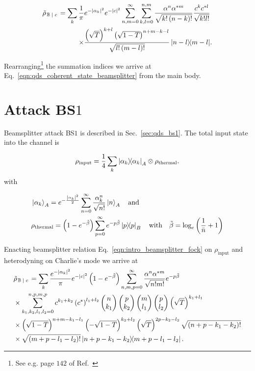 \begin{align}
\tilde{\rho}_{\left. \mathbb{B} \given c \right.} = \sum_k \frac{1}{\pi} e^{-\left|\alpha_k\right|^2}  e^{-\left|c\right|^2} \sum_{n, m = 0}^\infty \sum_{k, l = 0}^{n, m} \frac{\alpha^n \alpha^{* m}}{\sqrt{k! \left(n - k\right)!}} \frac{c^k c^{* l}}{\sqrt{k! l!}}& \notag \\
%
\times\frac{\left(\sqrt{T}\right)^{k+l} \left(\sqrt{1-T}\right)^{n + m - k - l}}{\sqrt{l! \left(m-l\right)!}} \dyad{n-l}{m-l}&.
\end{align}

\noindent Rearranging\footnote{See e.g. page $142$ of Ref.~\cite{Gerry_Knight_Textbook}} the summation indices we arrive at Eq.~\ref{eqn:qds_coherent_state_beamsplitter} from the main body.

\section{Attack BS$1$}\label{appendix:bs1}
Beamsplitter attack BS$1$ is described in Sec.~\ref{sec:qds_bs1}. The total input state into the channel is 

\begin{equation}\label{eqn:qds_bs1_input_state}
\rho_{\text{input}} = \frac{1}{4}\sum_k \dyad{\alpha_k}_A \otimes \rho_{\text{thermal}}.
\end{equation}
with 

\begin{align}
&\ket{\alpha_k}_A = e^{- \frac{\left| \alpha_k \right|^2}{2}} \sum_{n=0}^\infty \frac{\alpha_k^n}{\sqrt{n!}} \ket{n}_A \qq{and}\notag \\
&\rho_{\text{thermal}} = \left(1 - e^{-\tilde{\beta}}\right) \sum_{p=0}^\infty e^{- p \tilde{\beta}}\dyad{p}_B \qq{with} \tilde{\beta} = \log_e\left(\frac{1}{\bar{n}} +1\right)
\end{align}



\noindent Enacting beamsplitter relation Eq.~\ref{eqn:intro_beamsplitter_fock} on $\rho_{\text{input}}$ and heterodyning on Charlie's mode we arrive at 
\begin{align}\label{eqn:appendix_bs1_state}
%
&\tilde{\rho}_{\left. \mathbb{B} \given c\right.} = \sum_k \frac{e^{- \left|\alpha_k\right|^2}}{\pi} e^{-\left|c\right|^2} \left( 1 - e^{- \tilde{\beta}}\right) \sum_{n, m, p = 0}^\infty \frac{\alpha^n \alpha^{* m}}{\sqrt{n! m!}} e^{- p \tilde{\beta}}  \notag \\
%
&\times \sum_{k_1, k_2, l_1, l_2=0}^{n, p, m, p} c^{k_1 + k_2} \left(c^*\right)^{l_1 + l_2} \pmqty{n \\ k_1} \pmqty{ p \\ k_2} \pmqty{ m \\ l_1 } \pmqty{p \\ l_2} \left( \sqrt{T} \right)^{k_1 + l_1} \notag \\
%
&\times \left(\sqrt{1-T}\right)^{n + m - k_1 - l_1} \left( - \sqrt{1-T}\right)^{k_2 + l_2} \left( \sqrt{T} \right)^{2 p - k_2 - l_2}\sqrt{\left(n + p - k_1 - k_2\right)!}  \notag \\
%
&\times\sqrt{\left(m + p - l_1 - l_2 \right)!} \dyad{n + p - k_1 - k_2}{m + p - l_1 - l_2}.
%
\end{align}

